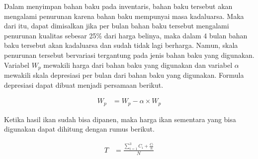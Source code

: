 


Dalam menyimpan bahan baku pada inventaris, bahan baku tersebut akan mengalami penurunan karena bahan baku mempunyai masa kadaluarsa. Maka dari itu, dapat dimisalkan jika per bulan bahan baku tersebut mengalami penurunan kualitas sebesar 25\% dari harga belinya, maka dalam 4 bulan bahan baku tersebut akan kadaluarsa dan sudah tidak lagi berharga. Namun, skala penurunan tersebut bervariasi tergantung pada jenis bahan baku yang digunakan. Variabel $W_p$ mewakili harga dari bahan baku yang digunakan dan variabel $\alpha$ mewakili skala depresiasi per bulan dari bahan baku yang digunakan. Formula depresiasi dapat dibuat menjadi persamaan berikut.

\begin{equation}
    \begin{split}
		W_p
		&= W_p - \alpha \times W_p
    \end{split}
\end{equation}

Ketika hasil ikan sudah bisa dipanen, maka harga ikan sementara yang bisa digunakan dapat dihitung dengan rumus berikut.

\begin{equation}
    \begin{split}
		T
		&= \frac{\sum_{i=1}^3 C_i + \frac{C_l}{n}}{N}
    \end{split}
\end{equation}

